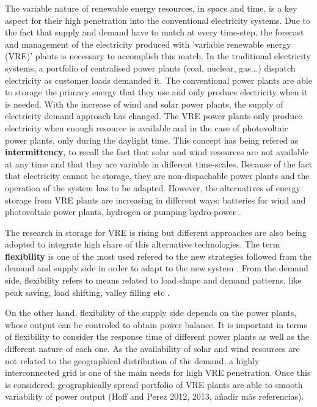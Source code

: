 The variable nature of renewable energy resources, in space and time, is a key aspect for their high penetration into the conventional electricity systems. Due to the fact that supply and demand have to match at every time-step, the forecast and management of the electricity produced with 'variable renewable energy (VRE)' plants is necessary to accomplish this match. In the traditional electricity systems, a portfolio of centralised power plants (coal, nuclear, gas...) dispatch electricity as customer loads demanded it. The conventional power plants are able to storage the primary energy that they use and only produce electricity when it is needed. With the increase of wind and solar power plants, the supply of electricity demand approach has changed. The VRE power plants only produce electricity when enough resource is available and in the case of photovoltaic power plants, only during the daylight time. This concept has being refered as \textbf{intermittency}, to recall the fact that solar and wind resources are not available at any time and that they are variable in different time-scales. Because of the fact that electricity cannot be storage, they are non-dispachable power plants and the operation of the system has to be adapted. However, the alternatives of energy storage from VRE plants are increasing in different ways: batteries for wind and photovoltaic power plants, hydrogen or pumping hydro-power \cite*{Lund2015, Blanco2018, Schaber2004}.

The research in storage for VRE is rising but different approaches are also being adopted to integrate high share of this alternative technologies. The term \textbf{flexibility} is one of the most used refered to the new strategies followed from the demand and supply side in order to adapt to the new system \cite*{KROPOSKI2017}. From the demand side, flexibility refers to means related to load shape and demand patterns, like peak saving, load shifting, valley filling etc \cite*{Lund2015}.

On the other hand, flexibility of the supply side depends on the power plants, whose output can be controled to obtain power balance. It is important in terms of flexibility to consider the response time of different power plants as well as the different nature of each one. As the availability of solar and wind resources are not related to the geographical distribution of the demand, a highly interconnected grid is one of the main needs for high VRE penetration. Once this is considered, geographically spread portfolio of VRE plants are able to smooth variability of power output \cite*{KROPOSKI2017, Marcos2012}(Hoff and Perez 2012, 2013, añadir más referencias).

